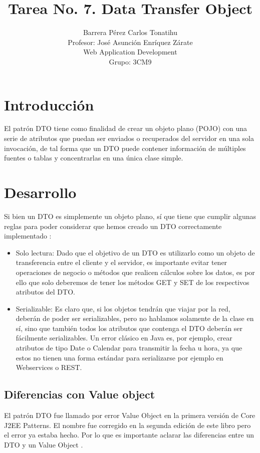 \documentclass[a4paper,12pt]{article}
\title{Tarea No. 7. Data Transfer Object}
\author{Barrera Pérez Carlos Tonatihu \\ Profesor: José Asunción Enríquez 
Zárate 
\\ Web Application Development \\ Grupo: 3CM9 }
\begin{document}
\maketitle
\newpage
\tableofcontents
\newpage

\section{Introducción}
El patrón DTO tiene como finalidad de crear un objeto plano (POJO) con una 
serie de atributos que puedan ser enviados o recuperados del servidor en una 
sola invocación, de tal forma que un DTO puede contener información de 
múltiples fuentes o tablas y concentrarlas en una única clase simple.

\section{Desarrollo}
Si bien un DTO es simplemente un objeto plano, sí que tiene que cumplir 
algunas reglas para poder considerar que hemos creado un DTO correctamente 
implementado \cite{oracle}:

\begin{itemize}
 \item Solo lectura: Dado que el objetivo de un DTO es utilizarlo como un 
objeto de transferencia entre el cliente y el servidor, es importante evitar 
tener operaciones de negocio o métodos que realicen cálculos sobre los datos, 
es por ello que solo deberemos de tener los métodos GET y SET de los 
respectivos atributos del DTO.
  \item Serializable: Es claro que, si los objetos tendrán que viajar por la 
red, deberán de poder ser serializables, pero no hablamos solamente de la 
clase en sí, sino que también todos los atributos que contenga el DTO deberán 
ser fácilmente serializables. Un error clásico en Java es, por ejemplo, crear 
atributos de tipo Date o Calendar para transmitir la fecha u hora, ya que 
estos no tienen una forma estándar para serializarse por ejemplo en 
Webservices o REST.
\end{itemize}

\subsection{Diferencias con Value object}
El patrón DTO fue llamado por error Value Object en la primera versión de Core 
J2EE Patterns. El nombre fue corregido en la segunda edición de este libro pero 
el error ya estaba hecho. Por lo que es importante aclarar las diferencias 
entre un DTO y un Value Object \cite{adam}.
\end{document}
